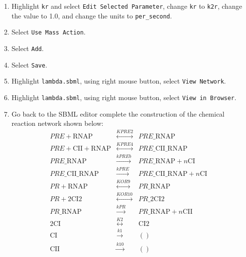 \documentclass[titlepage,11pt]{article}
\begin{document}
\begin{enumerate}
      {\tt kf} to {\tt k2f}, and change the units to {\tt per\_second\_mole}.
\item Highlight {\tt kr} and select {\tt Edit Selected Parameter}, change
      {\tt kr} to {\tt k2r}, change the value to 1.0, and change 
      the units to {\tt per\_second}.
\item Select {\tt Use Mass Action}.
\item Select {\tt Add}.
\item Select {\tt Save}.
\item Highlight {\tt lambda.sbml}, using right mouse button, select 
      {\tt View Network}.
\item Highlight {\tt lambda.sbml}, using right mouse button, select 
      {\tt View in Browser}.
\item Go back to the SBML editor complete the construction of the
      chemical reaction network shown below:
\begin{eqnarray*}
PRE + \mathrm{RNAP} & \stackrel{KPRE2}{\longleftrightarrow} &
PRE\_\mathrm{RNAP} \\
PRE + \mathrm{CII} + \mathrm{RNAP} &
\stackrel{KPRE4}{\longleftrightarrow} &
PRE\_\mathrm{CII}\_\mathrm{RNAP} \\
PRE\_\mathrm{RNAP} & \stackrel{kPREb}{\longrightarrow} & 
PRE\_\mathrm{RNAP} + n\mathrm{CI} \\
PRE\_\mathrm{CII}\_\mathrm{RNAP} 
& \stackrel{kPRE}{\longrightarrow} & 
PRE\_\mathrm{CII}\_\mathrm{RNAP} + n\mathrm{CI} \\
PR + \mathrm{RNAP} & \stackrel{KOR9}{\longleftrightarrow} &
PR\_\mathrm{RNAP} \\
PR + 2 \mathrm{CI2} & \stackrel{KOR10}{\longleftrightarrow} &
PR\_2 \mathrm{CI2} \\
PR\_\mathrm{RNAP} & \stackrel{kPR}{\longrightarrow} & 
PR\_\mathrm{RNAP} + n\mathrm{CII} \\
2 \mathrm{CI} & \stackrel{K2}{\longleftrightarrow} & \mathrm{CI2} \\
\mathrm{CI} & \stackrel{k1}{\longrightarrow} & () \\ 
\mathrm{CII} & \stackrel{k10}{\longrightarrow} & ()
\end{eqnarray*}


\end{enumerate}
\end{document}
